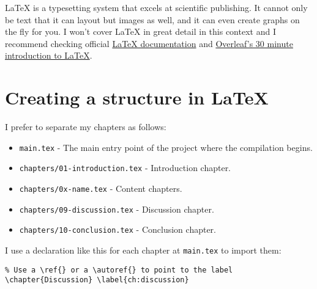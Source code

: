 LaTeX is a typesetting system that excels at scientific publishing.
It cannot only be text that it can layout but images as well, and it can even create graphs on the fly for you.
I won't cover LaTeX in great detail in this context and I recommend checking official \href{https://www.latex-project.org/}{LaTeX documentation} and \href{https://www.overleaf.com/learn/latex/Learn_LaTeX_in_30_minutes}{Overleaf's 30 minute introduction to LaTeX}. %

\section{Creating a structure in LaTeX}
\label{sec:creating-a-structure}


I prefer to separate my chapters as follows:

\begin{itemize}
    \item \texttt{main.tex} - The main entry point of the project where the compilation begins. %
    \item \texttt{chapters/01-introduction.tex} - Introduction chapter.
    \item \texttt{chapters/0x-name.tex} - Content chapters.
    \item \texttt{chapters/09-discussion.tex} - Discussion chapter.
    \item \texttt{chapters/10-conclusion.tex} - Conclusion chapter.
\end{itemize}

I use a declaration like this for each chapter at \texttt{main.tex} to import them:

\begin{verbatim}
% Use a \ref{} or a \autoref{} to point to the label
\chapter{Discussion} \label{ch:discussion}

\end{verbatim}

